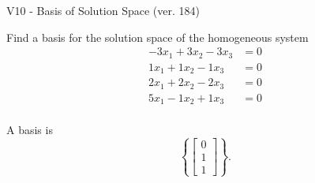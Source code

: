 \begin{exercise}
  \begin{exerciseTitle}V10 - Basis of Solution Space (ver. 184)\end{exerciseTitle}
  \begin{exerciseStatement}
    Find a basis for the solution space of the homogeneous system 
\begin{align*}
 -3 x_ 1 + 3 x_ 2 -3 x_ 3 &= 0  \\ 
  1 x_ 1 + 1 x_ 2 -1 x_ 3 &= 0  \\ 
  2 x_ 1 + 2 x_ 2 -2 x_ 3 &= 0  \\ 
  5 x_ 1 -1 x_ 2 + 1 x_ 3 &= 0  \\ 
 \end{align*}


 
  \end{exerciseStatement}

  \begin{exerciseAnswer}
   A basis is   
\[\left\{\left[\begin{array}{c}
0 \\
1 \\
1
\end{array}\right]\right\}.\]

  


  \end{exerciseAnswer}
\end{exercise}